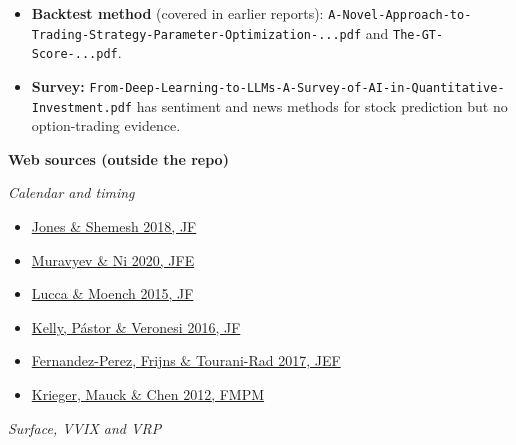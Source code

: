 \documentclass{article}
\begin{document}
\begin{itemize}
\item \textbf{Backtest method} (covered in earlier reports): \texttt{A-\allowbreak{}Novel-\allowbreak{}Approach-\allowbreak{}to-\allowbreak{}Trading-\allowbreak{}Strategy-\allowbreak{}Parameter-\allowbreak{}Optimization-\allowbreak{}.\allowbreak{}.\allowbreak{}.\allowbreak{}pdf} and \texttt{The-\allowbreak{}GT-\allowbreak{}Score-\allowbreak{}.\allowbreak{}.\allowbreak{}.\allowbreak{}pdf}.

\item \textbf{Survey:} \texttt{From-\allowbreak{}Deep-\allowbreak{}Learning-\allowbreak{}to-\allowbreak{}LLMs-\allowbreak{}A-\allowbreak{}Survey-\allowbreak{}of-\allowbreak{}AI-\allowbreak{}in-\allowbreak{}Quantitative-\allowbreak{}Investment.\allowbreak{}pdf} has sentiment and news methods for stock prediction but no option-trading evidence.

\end{itemize}

\textbf{Web sources (outside the repo)}

\emph{Calendar and timing}

\begin{itemize}

\item \href{https://ideas.repec.org/a/bla/jfinan/v73y2018i2p861-900.html}{Jones \& Shemesh 2018, JF}

\item \href{https://ideas.repec.org/a/eee/jfinec/v136y2020i1p219-238.html}{Muravyev \& Ni 2020, JFE}

\item \href{https://ideas.repec.org/a/bla/jfinan/v70y2015i1p329-371.html}{Lucca \& Moench 2015, JF}

\item \href{https://ideas.repec.org/a/bla/jfinan/v71y2016i5p2417-2480.html}{Kelly, Pástor \& Veronesi 2016, JF}

\item \href{https://ideas.repec.org/a/eee/empfin/v41y2017icp187-199.html}{Fernandez-Perez, Frijns \& Tourani-Rad 2017, JEF}

\item \href{https://ideas.repec.org/a/kap/fmktpm/v26y2012i3p315-331.html}{Krieger, Mauck \& Chen 2012, FMPM}

\end{itemize}

\emph{Surface, VVIX and VRP}
\end{document}
